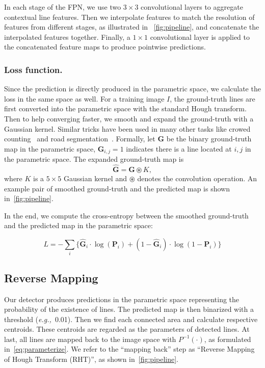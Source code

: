 \documentclass[10pt,journal,cspaper,compsoc]{IEEEtran}
\def\eg{\emph{e.g.,~}}
\begin{document}
In each stage of the FPN, 
we use two $3\times 3$ convolutional  layers
to aggregate contextual line features.
Then we interpolate features
to match the resolution of features from different stages, as illustrated in
~\cref{fig:pipeline},
and concatenate the interpolated features together.
Finally, a $1\times 1$ convolutional  layer is applied to the concatenated feature maps
to produce pointwise predictions.


\subsubsection{Loss function.}\label{sec:loss-func}
Since the prediction is directly produced in the parametric space,
we calculate the loss in the same space as well.
For a training image $I$, the ground-truth lines are first converted into
the parametric space with the standard Hough transform.
Then to help converging faster, we smooth and expand the ground-truth with a
Gaussian kernel.
Similar tricks have been used in many other tasks like
crowed counting~\cite{liu2019context,cheng2019learning} and road segmentation~\cite{VecRoad_20CVPR}.
Formally, let $\mathbf{G}$ be the binary ground-truth map in the parametric space,
$\mathbf{G}_{i,j} = 1$ indicates there is a line located at $i,j$ in the parametric space.
The expanded ground-truth map is
$$\hat{\mathbf{G}} = \mathbf{G}\circledast K,$$
where $K$ is a $5\times 5$ Gaussian kernel and $\circledast$ denotes the convolution operation.
An example pair of smoothed ground-truth and the predicted map is shown
in~\cref{fig:pipeline}.


In the end, we compute the cross-entropy between the smoothed ground-truth
and the predicted map in the parametric space:

\begin{equation}
  L = -\sum_i \Big\{ \hat{\mathbf{G}}_i\cdot\log(\mathbf{P}_i) +
                           (1-\hat{\mathbf{G}}_i)\cdot\log(1-\mathbf{P}_i)
                      \Big\}
\end{equation}


\subsection{Reverse Mapping}\label{sec:reverse}
Our detector produces predictions in the parametric space representing
the probability of the existence of lines.
The predicted map is then binarized with a threshold (\eg 0.01).
Then we find each connected area and calculate respective centroids.
These centroids are regarded as the parameters of detected lines.
At last, all lines are mapped back to the image space with
$P^{-1}(\cdot)$, as formulated in~\cref{eq:parameterize}.
We refer to the ``mapping back'' step as ``Reverse Mapping of Hough Transform (RHT)'',
as shown in~\cref{fig:pipeline}.
\end{document}
